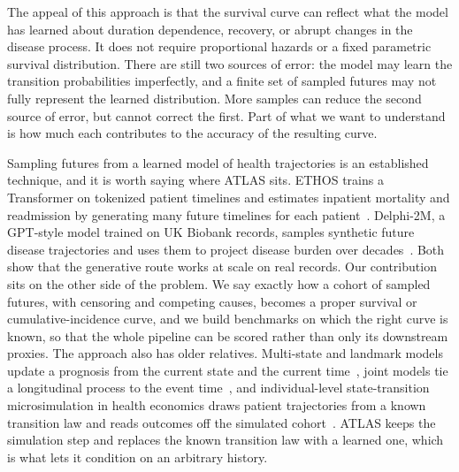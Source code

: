 The appeal of this approach is that the survival curve can reflect what the model has learned about duration dependence, recovery, or abrupt changes in the disease process. It does not require proportional hazards or a fixed parametric survival distribution. There are still two sources of error: the model may learn the transition probabilities imperfectly, and a finite set of sampled futures may not fully represent the learned distribution. More samples can reduce the second source of error, but cannot correct the first. Part of what we want to understand is how much each contributes to the accuracy of the resulting curve.

Sampling futures from a learned model of health trajectories is an established technique, and it is worth saying where ATLAS sits. ETHOS trains a Transformer on tokenized patient timelines and estimates inpatient mortality and readmission by generating many future timelines for each patient~\citep{renc2024}. Delphi-2M, a GPT-style model trained on UK Biobank records, samples synthetic future disease trajectories and uses them to project disease burden over decades~\citep{shmatko2025}. Both show that the generative route works at scale on real records. Our contribution sits on the other side of the problem. We say exactly how a cohort of sampled futures, with censoring and competing causes, becomes a proper survival or cumulative-incidence curve, and we build benchmarks on which the right curve is known, so that the whole pipeline can be scored rather than only its downstream proxies. The approach also has older relatives. Multi-state and landmark models update a prognosis from the current state and the current time~\citep{vanhouwelingen2007,putter2007}, joint models tie a longitudinal process to the event time~\citep{rizopoulos2012}, and individual-level state-transition microsimulation in health economics draws patient trajectories from a known transition law and reads outcomes off the simulated cohort~\citep{siebert2012}. ATLAS keeps the simulation step and replaces the known transition law with a learned one, which is what lets it condition on an arbitrary history.

